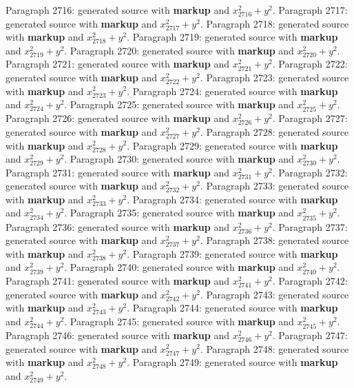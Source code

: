 \documentclass{article}
\begin{document}
Paragraph 2716: generated source with \textbf{markup} and $x_{2716}^2 + y^2$.
Paragraph 2717: generated source with \textbf{markup} and $x_{2717}^2 + y^2$.
Paragraph 2718: generated source with \textbf{markup} and $x_{2718}^2 + y^2$.
Paragraph 2719: generated source with \textbf{markup} and $x_{2719}^2 + y^2$.
Paragraph 2720: generated source with \textbf{markup} and $x_{2720}^2 + y^2$.
Paragraph 2721: generated source with \textbf{markup} and $x_{2721}^2 + y^2$.
Paragraph 2722: generated source with \textbf{markup} and $x_{2722}^2 + y^2$.
Paragraph 2723: generated source with \textbf{markup} and $x_{2723}^2 + y^2$.
Paragraph 2724: generated source with \textbf{markup} and $x_{2724}^2 + y^2$.
Paragraph 2725: generated source with \textbf{markup} and $x_{2725}^2 + y^2$.
Paragraph 2726: generated source with \textbf{markup} and $x_{2726}^2 + y^2$.
Paragraph 2727: generated source with \textbf{markup} and $x_{2727}^2 + y^2$.
Paragraph 2728: generated source with \textbf{markup} and $x_{2728}^2 + y^2$.
Paragraph 2729: generated source with \textbf{markup} and $x_{2729}^2 + y^2$.
Paragraph 2730: generated source with \textbf{markup} and $x_{2730}^2 + y^2$.
Paragraph 2731: generated source with \textbf{markup} and $x_{2731}^2 + y^2$.
Paragraph 2732: generated source with \textbf{markup} and $x_{2732}^2 + y^2$.
Paragraph 2733: generated source with \textbf{markup} and $x_{2733}^2 + y^2$.
Paragraph 2734: generated source with \textbf{markup} and $x_{2734}^2 + y^2$.
Paragraph 2735: generated source with \textbf{markup} and $x_{2735}^2 + y^2$.
Paragraph 2736: generated source with \textbf{markup} and $x_{2736}^2 + y^2$.
Paragraph 2737: generated source with \textbf{markup} and $x_{2737}^2 + y^2$.
Paragraph 2738: generated source with \textbf{markup} and $x_{2738}^2 + y^2$.
Paragraph 2739: generated source with \textbf{markup} and $x_{2739}^2 + y^2$.
Paragraph 2740: generated source with \textbf{markup} and $x_{2740}^2 + y^2$.
Paragraph 2741: generated source with \textbf{markup} and $x_{2741}^2 + y^2$.
Paragraph 2742: generated source with \textbf{markup} and $x_{2742}^2 + y^2$.
Paragraph 2743: generated source with \textbf{markup} and $x_{2743}^2 + y^2$.
Paragraph 2744: generated source with \textbf{markup} and $x_{2744}^2 + y^2$.
Paragraph 2745: generated source with \textbf{markup} and $x_{2745}^2 + y^2$.
Paragraph 2746: generated source with \textbf{markup} and $x_{2746}^2 + y^2$.
Paragraph 2747: generated source with \textbf{markup} and $x_{2747}^2 + y^2$.
Paragraph 2748: generated source with \textbf{markup} and $x_{2748}^2 + y^2$.
Paragraph 2749: generated source with \textbf{markup} and $x_{2749}^2 + y^2$.
\end{document}

